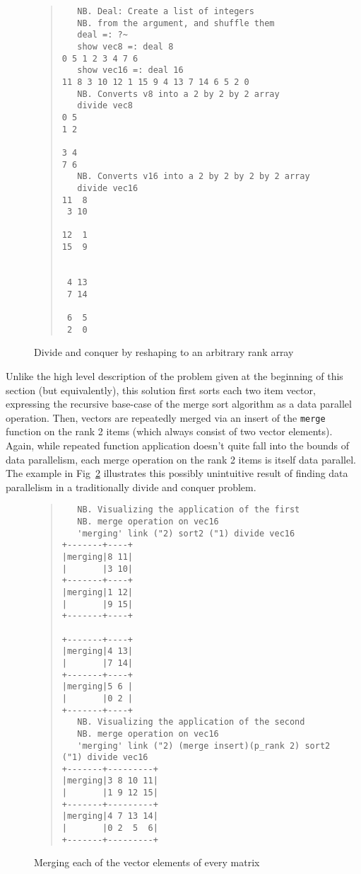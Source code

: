 \begin{figure}[pht]
\begin{quote}
\begin{singlespacing}
\begin{small}
\begin{verbatim}
   NB. Deal: Create a list of integers
   NB. from the argument, and shuffle them
   deal =: ?~
   show vec8 =: deal 8
0 5 1 2 3 4 7 6
   show vec16 =: deal 16
11 8 3 10 12 1 15 9 4 13 7 14 6 5 2 0
   NB. Converts v8 into a 2 by 2 by 2 array
   divide vec8
0 5
1 2

3 4
7 6
   NB. Converts v16 into a 2 by 2 by 2 by 2 array
   divide vec16
11  8
 3 10

12  1
15  9


 4 13
 7 14

 6  5
 2  0
\end{verbatim}
\end{small}
\end{singlespacing}
\end{quote}
\caption{Divide and conquer by reshaping to an arbitrary rank array}
\label{fig::divide}
\end{figure}

Unlike the high level description of the problem given at the beginning of this section (but equivalently), 
this solution first sorts each two item vector, 
expressing the recursive base-case of the merge sort algorithm as a data parallel operation.
Then, vectors are repeatedly merged via an insert of the \texttt{merge} function on the rank 2 items 
(which always consist of two vector elements).
Again, while repeated function application doesn't quite fall into the bounds of data parallelism, 
each merge operation on the rank 2 items is itself data parallel. 
The example in Fig~\ref{fig::conquer} illustrates this possibly unintuitive result of finding data parallelism 
in a traditionally divide and conquer problem.

\begin{figure}[hp]
\begin{quote}
\begin{singlespacing}
\begin{small}
\begin{verbatim}
   NB. Visualizing the application of the first
   NB. merge operation on vec16
   'merging' link ("2) sort2 ("1) divide vec16
+-------+----+
|merging|8 11|
|       |3 10|
+-------+----+
|merging|1 12|
|       |9 15|
+-------+----+

+-------+----+
|merging|4 13|
|       |7 14|
+-------+----+
|merging|5 6 |
|       |0 2 |
+-------+----+
   NB. Visualizing the application of the second
   NB. merge operation on vec16
   'merging' link ("2) (merge insert)(p_rank 2) sort2 ("1) divide vec16 
+-------+---------+
|merging|3 8 10 11|
|       |1 9 12 15|
+-------+---------+
|merging|4 7 13 14|
|       |0 2  5  6|
+-------+---------+
\end{verbatim}
\end{small}
\end{singlespacing}
\caption{Merging each of the vector elements of every matrix}
\label{fig::conquer}
\end{quote}

\end{figure}
